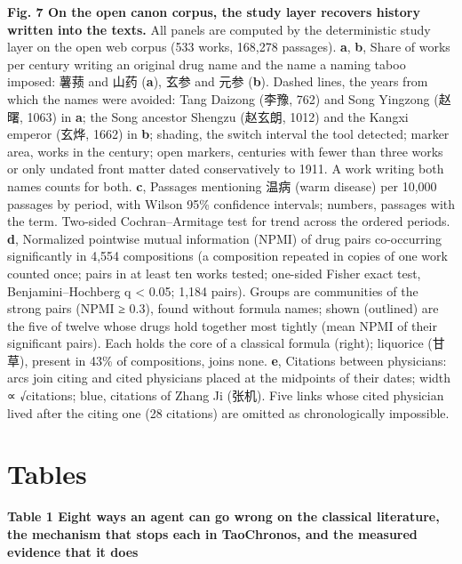 \documentclass[
]{article}
\begin{document}
\textbf{Fig. 7 \textbar{} On the open canon corpus, the study layer
recovers history written into the texts.} All panels are computed by the
deterministic study layer on the open web corpus (533 works, 168,278
passages). \textbf{a}, \textbf{b}, Share of works per century writing an
original drug name and the name a naming taboo imposed: 薯蓣 and 山药
(\textbf{a}), 玄参 and 元参 (\textbf{b}). Dashed lines, the years from
which the names were avoided: Tang Daizong (李豫, 762) and Song Yingzong
(赵曙, 1063) in \textbf{a}; the Song ancestor Shengzu (赵玄朗, 1012) and
the Kangxi emperor (玄烨, 1662) in \textbf{b}; shading, the switch
interval the tool detected; marker area, works in the century; open
markers, centuries with fewer than three works or only undated front
matter dated conservatively to 1911. A work writing both names counts
for both. \textbf{c}, Passages mentioning 温病 (warm disease) per 10,000
passages by period, with Wilson 95\% confidence intervals; numbers,
passages with the term. Two-sided Cochran--Armitage test for trend
across the ordered periods. \textbf{d}, Normalized pointwise mutual
information (NPMI) of drug pairs co-occurring significantly in 4,554
compositions (a composition repeated in copies of one work counted once;
pairs in at least ten works tested; one-sided Fisher exact test,
Benjamini--Hochberg q \textless{} 0.05; 1,184 pairs). Groups are
communities of the strong pairs (NPMI ≥ 0.3), found without formula
names; shown (outlined) are the five of twelve whose drugs hold together
most tightly (mean NPMI of their significant pairs). Each holds the core
of a classical formula (right); liquorice (甘草), present in 43\% of
compositions, joins none. \textbf{e}, Citations between physicians: arcs
join citing and cited physicians placed at the midpoints of their dates;
width ∝ √citations; blue, citations of Zhang Ji (张机). Five links whose
cited physician lived after the citing one (28 citations) are omitted as
chronologically impossible.

\hypertarget{tables}{%
\section{Tables}\label{tables}}

\textbf{Table 1 \textbar{} Eight ways an agent can go wrong on the
classical literature, the mechanism that stops each in TaoChronos, and
the measured evidence that it does}
\end{document}
